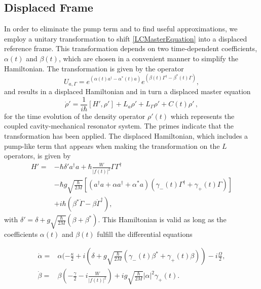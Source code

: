 \documentclass[reprint, amsmath,amssymb, aps,pra]{revtex4-1}
\begin{document}
\subsection{Displaced Frame}

In order to eliminate the pump term and to find useful
  approximations, we employ a unitary transformation to
shift \eqref{LCMasterEquation} into a displaced reference frame. This
transformation depends on two time-dependent coefficients, $\alpha(t)$
and $\beta(t)$, which are chosen in a convenient manner to simplify
the Hamiltonian. The transformation is given by the operator
\begin{equation}\label{ShiftTransform}
U_{a,\Gamma} = e^{(\alpha(t) a^\dagger - \alpha^*(t)a)}e^{(\beta(t) \Gamma^\dagger - \beta^*(t)\Gamma)},
\end{equation}
and results in a displaced Hamiltonian and in turn a displaced master
equation
\begin{equation}\label{eq:master_no_small}
\dot{\rho}' = \frac{1}{i\hbar}[H',\rho'] +L_a\rho' + L_\Gamma \rho' + C(t)\rho'\, ,
\end{equation}
for the time evolution of the density operator $\rho'(t)$ which
represents the coupled cavity-mechanical resonator system. The primes
indicate that the transformation has been applied. The displaced
Hamiltonian, which includes a pump-like term that appears when making the
transformation on the $L$ operators, is given by
\begin{align}\label{eq:hamiltonian_no_small}
  H'=& -\hbar \delta' a^\dagger a + \hbar\frac{W}{|f(t)|^2}\Gamma \Gamma^\dagger\nonumber\\
     &-\hbar g\sqrt{\frac{\hbar}{2M}}[(a^{\dagger}a +\alpha a^{\dagger}+\alpha^* a)(\gamma_-(t)\Gamma^{\dagger}+\gamma_+(t)\Gamma)]\nonumber\\
     &+ i\hbar(\beta^*\dot{\Gamma} - \beta \dot{\Gamma}^\dagger),
\end{align}
with $\delta' = \delta + g\sqrt{\frac{\hbar}{2M}}(\beta + \beta^*)$.
This Hamiltonian is valid as long as the coefficients $\alpha(t)$ and
$\beta(t)$ fulfill the differential equations

\begin{align}\label{eq:displaced_frame}
\dot{\alpha} =& \alpha(-\frac{\kappa}{2}+i(\delta+g\sqrt{\frac{\hbar}{2M}}(\gamma_-(t) \beta^* + \gamma_+(t) \beta))-i\frac{\Omega}{2},\\
\dot{\beta} =& \beta(-\frac{\gamma}{2}-i\frac{W}{|f(t)|^2})+ig\sqrt{\frac{\hbar}{2M}}|\alpha|^2\gamma_+(t).
\end{align}
\end{document}

